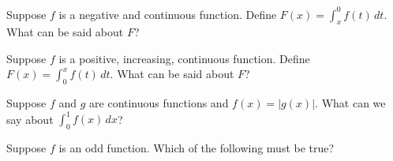 \documentclass{ximera}
\newcommand{\recommendation}[1]{}
\begin{document}
\begin{shuffle}

\begin{problem}
  Suppose $f$ is a negative and continuous function.  Define $F(x) = \int_x^0 f(t) \, dt$.  What can be said about $F$?
  \begin{multipleChoice}
  \end{multipleChoice}
\end{problem}

\begin{problem}
  Suppose $f$ is a positive, increasing, continuous function.  Define $F(x) = \int_0^x f(t) \, dt$.  What can be said about $F$?
  \begin{multipleChoice}
  \end{multipleChoice}
\end{problem}

\begin{problem}
  Suppose $f$ and $g$ are continuous functions and $f(x) = |g(x)|$.  What can we say about $\int_0^1 f(x) \, dx$?
  \begin{multipleChoice}
  \end{multipleChoice}
\end{problem}


\begin{problem}
  Suppose $f$ is an odd function. Which of the following must be true?
  \begin{multipleChoice}
  \end{multipleChoice}
\end{problem}




\end{shuffle}
\end{document}

